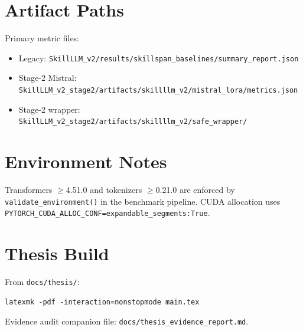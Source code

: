 \section{Artifact Paths}

Primary metric files:

\begin{itemize}
  \item Legacy: \texttt{SkillLLM\_v2/results/skillspan\_baselines/summary\_report.json}
  \item Stage-2 Mistral: \texttt{SkillLLM\_v2\_stage2/artifacts/skillllm\_v2/mistral\_lora/metrics.json}
  \item Stage-2 wrapper: \texttt{SkillLLM\_v2\_stage2/artifacts/skillllm\_v2/safe\_wrapper/}
\end{itemize}

\section{Environment Notes}

Transformers $\geq$4.51.0 and tokenizers $\geq$0.21.0 are enforced by \texttt{validate\_environment()} in the benchmark pipeline.
CUDA allocation uses \texttt{PYTORCH\_CUDA\_ALLOC\_CONF=expandable\_segments:True}.

\section{Thesis Build}

From \texttt{docs/thesis/}:

\begin{verbatim}
latexmk -pdf -interaction=nonstopmode main.tex
\end{verbatim}

Evidence audit companion file: \texttt{docs/thesis\_evidence\_report.md}.
